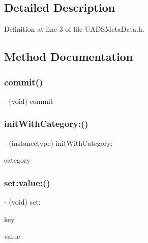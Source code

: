 \subsection{Detailed Description}


Definition at line 3 of file U\+A\+D\+S\+Meta\+Data.\+h.



\subsection{Method Documentation}
\mbox{\label{interface_u_a_d_s_meta_data_a333b8cb442bac586a94270b0d944880a}} 
\subsubsection{\texorpdfstring{commit()}{commit()}}
{\footnotesize\ttfamily -\/ (void) commit \begin{DoxyParamCaption}{ }\end{DoxyParamCaption}}

\mbox{\label{interface_u_a_d_s_meta_data_a0875e3b109149d0b92112b69dd4620d1}} 
\subsubsection{\texorpdfstring{initWithCategory:()}{initWithCategory:()}}
{\footnotesize\ttfamily -\/ (instancetype) init\+With\+Category\+: \begin{DoxyParamCaption}\item[{(N\+S\+String $\ast$)}]{category }\end{DoxyParamCaption}}

\mbox{\label{interface_u_a_d_s_meta_data_ace97e85bbfad37c8d2b92ca7b3fc7b17}} 
\subsubsection{\texorpdfstring{set:value:()}{set:value:()}}
{\footnotesize\ttfamily -\/ (void) set\+: \begin{DoxyParamCaption}\item[{(N\+S\+String $\ast$)}]{key }\item[{value\+:(id)}]{value }\end{DoxyParamCaption}}




